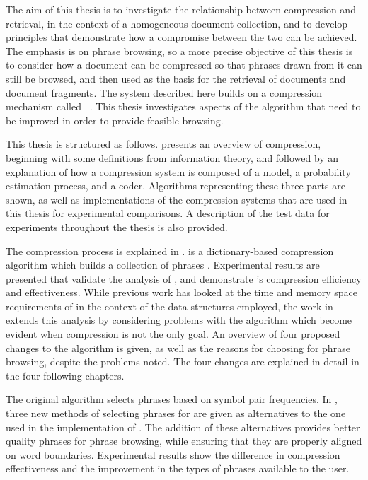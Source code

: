 The aim of this thesis is to investigate the relationship
between compression and retrieval, in the context of a homogeneous
document collection, and to develop principles 
that demonstrate how a compromise between the two can be achieved.  
The emphasis is on phrase browsing, so a
more precise objective of this thesis is to consider how a document
can be compressed so that phrases drawn from it can
still be browsed, and then used as the basis for the retrieval of
documents and document fragments.  The system described here 
builds on a compression mechanism
called \repair\ \citep{lm00:procieee}.  This thesis investigates
aspects of the \repair algorithm that need to be improved in order
to provide feasible browsing.


This thesis is structured as follows.   presents
an overview of compression, beginning with some
definitions from information theory, and followed by an explanation 
of how a compression system is composed of a model, a probability
estimation process, and a coder.
Algorithms representing these three parts are shown, as well
as implementations of the compression systems that are used in
this thesis for experimental comparisons.  A
description of the test data for experiments throughout the 
thesis is also provided.

The \repair compression process is explained 
in .  \repair is a dictionary-based 
compression algorithm which builds a collection of 
phrases \citep{lm00:procieee}.  
Experimental results are presented that validate the analysis of
\citeauthor{lm00:procieee}, and demonstrate
\repair's compression efficiency and effectiveness.
While previous work has
looked at the time and memory space
requirements of \repair in the context of the data
structures employed, the work in 
extends this analysis by
considering problems with the algorithm which become evident
when compression is not the only goal.  An overview of four 
proposed changes to the algorithm is given, as well as
the reasons for choosing \repair for phrase browsing, despite
the problems noted.  The 
four changes are explained in detail in the four 
following chapters.

The original \repair algorithm selects phrases based on
symbol pair frequencies.  In , 
three new methods of 
selecting phrases for \repair are given as alternatives to the
one used in the implementation of \citet{lm00:procieee}.  
The addition of these 
alternatives provides better quality phrases for phrase browsing, 
while ensuring that they are properly aligned on word 
boundaries.  Experimental results show
the difference in compression effectiveness and the improvement
in the types of phrases available to the user.


